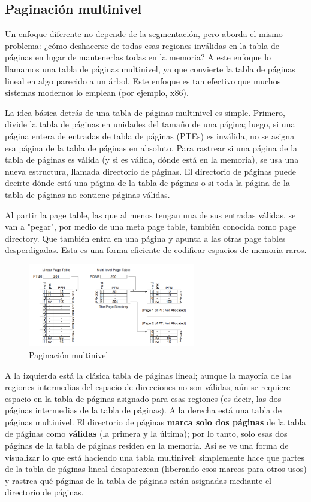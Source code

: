 \documentclass{article}
\begin{document}
\subsection{Paginación multinivel}
Un enfoque diferente no depende de la segmentación, pero aborda el mismo problema: ¿cómo deshacerse de todas esas regiones inválidas en la tabla de páginas en lugar de mantenerlas todas en la memoria? A este enfoque lo llamamos una tabla de páginas multinivel, ya que convierte la tabla de páginas lineal en algo parecido a un árbol. Este enfoque es tan efectivo que muchos sistemas modernos lo emplean (por ejemplo, x86).

La idea básica detrás de una tabla de páginas multinivel es simple. Primero, divide la tabla de páginas en unidades del tamaño de una página; luego, si una página entera de entradas de tabla de páginas (PTEs) es inválida, no se asigna esa página de la tabla de páginas en absoluto. Para rastrear si una página de la tabla de páginas es válida (y si es válida, dónde está en la memoria), se usa una nueva estructura, llamada directorio de páginas. El directorio de páginas puede decirte dónde está una página de la tabla de páginas o si toda la página de la tabla de páginas no contiene páginas válidas.

Al partir la page table, las que al menos tengan una de sus entradas válidas, se van a "pegar", por medio de una meta page table, también conocida como page directory. Que también entra en una página y apunta a las otras page tables desperdigadas. Esta es una forma eficiente de codificar espacios de memoria raros.

\begin{figure}[h]
    \centering
    \includegraphics[width=0.65\textwidth]{src/multinivel.png}
    \caption{Paginación multinivel}
\end{figure}

A la izquierda está la clásica tabla de páginas lineal; aunque la mayoría de las regiones intermedias del espacio de direcciones no son válidas, aún se requiere espacio en la tabla de páginas asignado para esas regiones (es decir, las dos páginas intermedias de la tabla de páginas). A la derecha está una tabla de páginas multinivel. El directorio de páginas \textbf{marca solo dos páginas} de la tabla de páginas como \textbf{válidas} (la primera y la última); por lo tanto, solo esas dos páginas de la tabla de páginas residen en la memoria. Así se ve una forma de visualizar lo que está haciendo una tabla multinivel: simplemente hace que partes de la tabla de páginas lineal desaparezcan (liberando esos marcos para otros usos) y rastrea qué páginas de la tabla de páginas están asignadas mediante el directorio de páginas.
\end{document}
